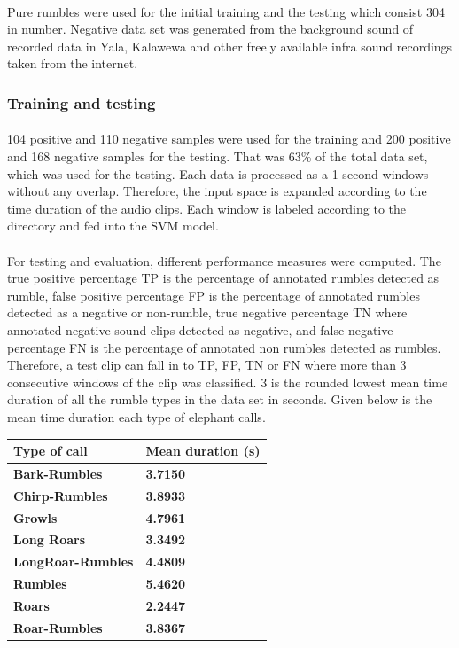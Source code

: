 \documentclass[12pt]{article}
\numberwithin{figure}{section}
\numberwithin{table}{section}
\begin{document}
\paragraph{}
Pure rumbles were used for the initial training and the testing which consist 304 in number. Negative data set was generated from the background sound of recorded data in Yala, Kalawewa and other freely available infra sound recordings taken from the internet. 
\subsubsection{Training and testing}
\paragraph{}
104 positive and 110 negative samples were used for the training and 200 positive and 168 negative samples for the testing. That was 63\% of the total data set, which was used for the testing. Each data is processed as a 1 second windows without any overlap. Therefore, the input space is expanded according to the time duration of the audio clips. Each window is labeled according to the directory and fed into the SVM model.

\paragraph{}
For testing and evaluation, different performance measures were computed. The true positive percentage TP is the percentage of annotated rumbles detected as rumble, false positive percentage FP is the percentage of annotated rumbles detected as a negative or non-rumble, true negative percentage TN where annotated negative sound clips detected as negative, and false negative percentage FN is the percentage of annotated non rumbles detected as rumbles. Therefore, a test clip can fall in to TP, FP, TN or FN where more than 3 consecutive windows of the clip was classified. 3 is the rounded lowest mean time duration of all the rumble types in the data set in seconds. Given below is the mean time duration each type of elephant calls.

\begin{table}[H]
\centering
\begin{tabular}{|m{}|m{}|} 
\hline
\bf {Type of call} &  {\bf{Mean duration (s)}}\\
\hline
\hline
\bf {Bark-Rumbles} &  {\bf{ 3.7150}} \\
\hline
\bf {Chirp-Rumbles} &  {\bf{3.8933}} \\
\hline
\bf {Growls} &  {\bf{  4.7961}} \\
\hline
\bf {Long Roars} &  {\bf{ 3.3492}} \\
\hline
\bf {LongRoar-Rumbles} &  {\bf{4.4809}} \\
\hline
\bf {Rumbles} &  {\bf{ 5.4620}} \\
\hline
\bf {Roars} &  {\bf{ 2.2447}} \\
\hline
\bf {Roar-Rumbles} &  {\bf{3.8367}} \\
\hline
\end{tabular}
\end{table}
 
\end{document}
